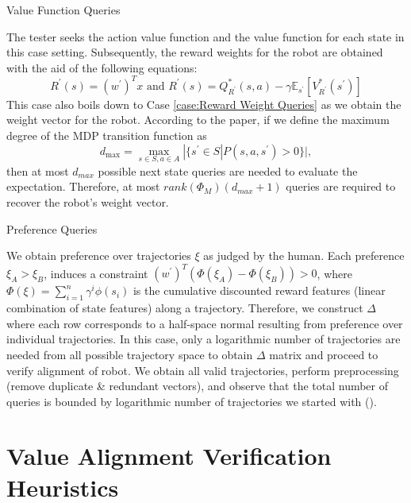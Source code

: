 \begin{case}
\label{case:Value Function Queries}
Value Function Queries
\end{case} 

The tester seeks the action value function and the value function for each state in this case setting. Subsequently, the reward weights for the robot are obtained with the aid of the following equations: 
    \begin{equation*}
        R^{'}(s) = (w^{'})^{T}x \text{ and } R^{'}(s) = Q^{*}_{R^{'}}(s, a) - \gamma \mathbb{E}_{s^{'}}[V^{*}_{R^{'}}(s^{'})]
    \end{equation*}
This case also boils down to Case \ref{case:Reward Weight Queries} as we obtain the weight vector for the robot. According to the paper, if we define the maximum degree of the MDP transition function as 
    \begin{equation*}
        d_{\max} = \max_{s \in S, a \in A} | \{ s^{'} \in S | P(s, a, s^{'}) > 0\}|, 
    \end{equation*}
then at most $d_{max}$ possible next state queries are needed to evaluate the expectation. Therefore, at most $rank(\Phi_{M})(d_{max} + 1)$ queries are required to recover the robot's weight vector. 

\begin{case}
\label{case:Preference Queries}
Preference Queries
\end{case}

We obtain preference over trajectories $\xi$ as judged by the human. Each preference $\xi_{A} > \xi_{B}$, induces a constraint $(w^{'})^{T} (\Phi(\xi_A) - \Phi(\xi_B)) > 0$, where $\Phi(\xi) = \sum_{i=1}^{n} \gamma^i \phi(s_i)$ is the cumulative discounted reward features (linear combination of state features) along a trajectory. Therefore, we construct $\Delta$ where each row corresponds to a half-space normal resulting from preference over individual trajectories. In this case, only a logarithmic number of trajectories are needed from all possible trajectory space to obtain $\Delta$ matrix and proceed to verify alignment of robot. We obtain all valid trajectories, perform preprocessing (remove duplicate \& redundant vectors), and observe that the total number of queries is bounded by logarithmic number of trajectories we started with (\cite{brown2019drex}).

\section{Value Alignment Verification Heuristics}

